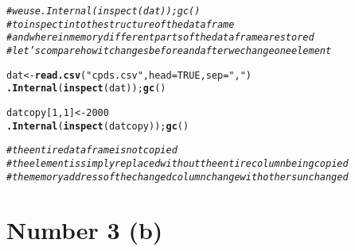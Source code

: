 \documentclass[english]{article}\usepackage[]{graphicx}\usepackage[]{color}
\makeatletter
\newcommand{\hlnum}[1]{\textcolor[rgb]{0.686,0.059,0.569}{#1}}%
\newcommand{\hlstr}[1]{\textcolor[rgb]{0.192,0.494,0.8}{#1}}%
\newcommand{\hlcom}[1]{\textcolor[rgb]{0.678,0.584,0.686}{\textit{#1}}}%
\newcommand{\hlstd}[1]{\textcolor[rgb]{0.345,0.345,0.345}{#1}}%
\newcommand{\hlkwb}[1]{\textcolor[rgb]{0.69,0.353,0.396}{#1}}%
\newcommand{\hlkwc}[1]{\textcolor[rgb]{0.333,0.667,0.333}{#1}}%
\newcommand{\hlkwd}[1]{\textcolor[rgb]{0.737,0.353,0.396}{\textbf{#1}}}%
\newenvironment{kframe}{%
 \def\at@end@of@kframe{}%
 \ifinner\ifhmode%
  \def\at@end@of@kframe{\end{minipage}}%
  \begin{minipage}{\columnwidth}%
 \fi\fi%
 \def\FrameCommand##1{\hskip\@totalleftmargin \hskip-\fboxsep
 \colorbox{shadecolor}{##1}\hskip-\fboxsep
     \hskip-\linewidth \hskip-\@totalleftmargin \hskip\columnwidth}%
 \MakeFramed {\advance\hsize-\width
   \@totalleftmargin\z@ \linewidth\hsize
   \@setminipage}}%
 {\par\unskip\endMakeFramed%
 \at@end@of@kframe}
\newenvironment{knitrout}{}{} %
\makeatother
\begin{document}
\begin{knitrout}
\color{fgcolor}\begin{kframe}
\begin{alltt}
\hlcom{# we use .Internal(inspect(dat)); gc()}
\hlcom{# to inspect into the structure of the data frame}
\hlcom{# and where in memory different parts of the data frame are stored}
\hlcom{# let's compare how it changes before and after we change one element}

\hlstd{dat} \hlkwb{<-} \hlkwd{read.csv}\hlstd{(}\hlstr{"cpds.csv"}\hlstd{,} \hlkwc{head} \hlstd{=} \hlnum{TRUE}\hlstd{,} \hlkwc{sep} \hlstd{=} \hlstr{","}\hlstd{)}
\hlkwd{.Internal}\hlstd{(}\hlkwd{inspect}\hlstd{(dat));} \hlkwd{gc}\hlstd{()}

\hlstd{datcopy[}\hlnum{1}\hlstd{,}\hlnum{1}\hlstd{]} \hlkwb{<-} \hlnum{2000}
\hlkwd{.Internal}\hlstd{(}\hlkwd{inspect}\hlstd{(datcopy));} \hlkwd{gc}\hlstd{()}

\hlcom{# the entire data frame is not copied}
\hlcom{# the element is simply replaced without the entire column being copied}
\hlcom{# the memory address of the changed column change with others unchanged}
\end{alltt}
\end{kframe}
\end{knitrout}


\section*{Number 3 (b)}
\end{document}
